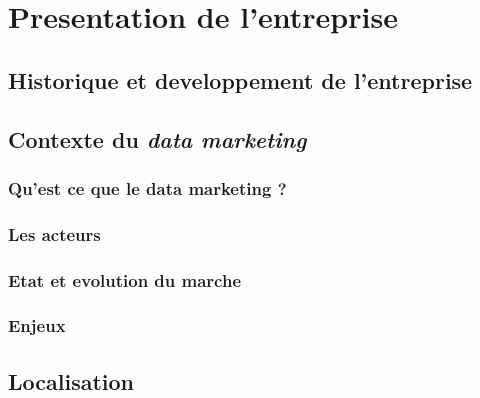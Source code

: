 \section{Presentation de l'entreprise}
    \subsection{Historique et developpement de l'entreprise}
    \subsection{Contexte du \emph{data marketing}}
        \subsubsection{Qu'est ce que le data marketing ?}
        \subsubsection{Les acteurs}
        \subsubsection{Etat et evolution du marche}
        \subsubsection{Enjeux}
    \subsection{Localisation}



